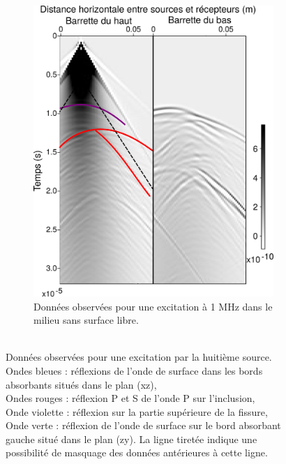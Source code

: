 \documentclass[a4paper,11pt]{report} %
\begin{document}
\begin{figure}[!h]
\begin{subfigure}{0.45\textwidth}
		\includegraphics[width=\textwidth]{img/multi_ref_trans/data_0freesurf.png}
	\caption{Données observées pour une excitation à 1 MHz dans le milieu sans surface libre.\\~}
	\end{subfigure}
	\caption{Données observées pour une excitation par la huitième source.\\
	Ondes bleues : réflexions de l'onde de surface dans les bords absorbants situés dans le plan (xz),\\
	Ondes rouges : réflexion P et S de l'onde P sur l'inclusion,\\
	Onde violette : réflexion sur la partie supérieure de la fissure,\\
	Onde verte : réflexion de l'onde de surface sur le bord absorbant gauche situé dans le plan (zy).
	La ligne tiretée indique une possibilité de masquage des données antérieures à cette ligne.\label{data}}
\end{figure}


\end{document}
